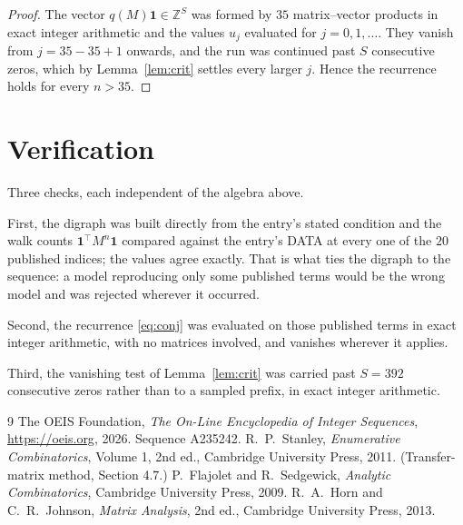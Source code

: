 \documentclass[11pt,a4paper]{article}
\theoremstyle{plain}
\theoremstyle{definition}
\begin{document}
\begin{proof}
The vector $q(M)\mathbf{1}\in\mathbb{Z}^{S}$ was formed by $35$ matrix--vector
products in exact integer arithmetic and the values $u_j$ evaluated for
$j=0,1,\dots$. They vanish from $j=35-35+1$ onwards, and the run was continued past
$S$ consecutive zeros, which by Lemma~\ref{lem:crit} settles every larger $j$. Hence the
recurrence holds for every $n>35$.
\end{proof}

\section{Verification}

Three checks, each independent of the algebra above.

First, the digraph was built directly from the entry's stated condition and the walk counts
$\mathbf{1}^{\!\top}M^{n}\mathbf{1}$ compared against the entry's DATA at every one of
the $20$ published indices; the values agree exactly. That is what ties the digraph to
the sequence: a model reproducing only some published terms would be the wrong model and
was rejected wherever it occurred.

Second, the recurrence \eqref{eq:conj} was evaluated on those published terms in exact
integer arithmetic, with no matrices involved, and vanishes wherever it applies.

Third, the vanishing test of Lemma~\ref{lem:crit} was carried past $S=392$ consecutive
zeros rather than to a sampled prefix, in exact integer arithmetic.

\begin{thebibliography}{9}
 The OEIS Foundation, \emph{The On-Line Encyclopedia of Integer
Sequences}, \url{https://oeis.org}, 2026. Sequence A235242.
 R.~P.~Stanley, \emph{Enumerative Combinatorics}, Volume 1, 2nd ed.,
Cambridge University Press, 2011. (Transfer-matrix method, Section 4.7.)
 P.~Flajolet and R.~Sedgewick, \emph{Analytic Combinatorics}, Cambridge
University Press, 2009.
 R.~A.~Horn and C.~R.~Johnson, \emph{Matrix Analysis}, 2nd ed., Cambridge
University Press, 2013.
\end{thebibliography}
\end{document}
